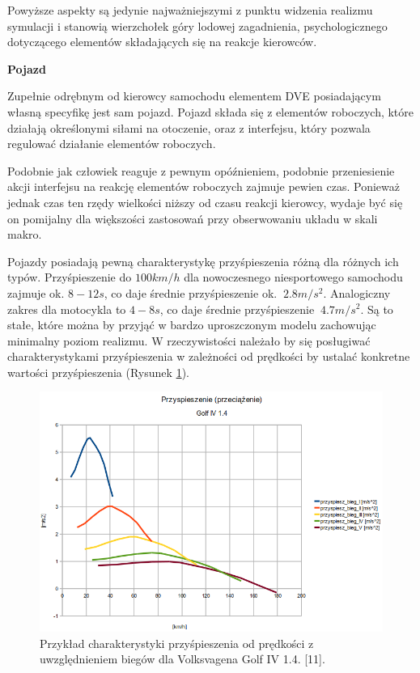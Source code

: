 {{}
\par{
Powyższe aspekty są jedynie najważniejszymi z punktu widzenia realizmu symulacji i stanowią wierzchołek góry lodowej zagadnienia, psychologicznego dotyczącego elementów składających się na reakcje kierowców.
}
\par{ }
\par{
\textbf{Pojazd}
}
\par{
Zupełnie odrębnym od kierowcy samochodu elementem DVE posiadającym własną specyfikę jest sam pojazd. Pojazd składa się z elementów roboczych, które działają określonymi siłami na otoczenie, oraz z interfejsu, który pozwala regulować działanie elementów roboczych.
}
\par{
Podobnie jak człowiek reaguje z pewnym opóźnieniem, podobnie przeniesienie akcji interfejsu na reakcję elementów roboczych zajmuje pewien czas. Ponieważ jednak czas ten rzędy wielkości niższy od czasu reakcji kierowcy, wydaje być się on pomijalny dla większości zastosowań przy obserwowaniu układu w skali makro.
}
\par{
Pojazdy posiadają pewną charakterystykę przyśpieszenia różną dla różnych ich typów. Przyśpieszenie do $100km/h$ dla nowoczesnego niesportowego samochodu zajmuje ok. $8-12s$, co daje średnie przyśpieszenie ok. $~2.8m/s^2$. Analogiczny zakres dla motocykla to $4-8s$, co daje średnie przyśpieszenie $~4.7m/s^2$. Są to stałe, które można by przyjąć w bardzo uproszczonym modelu zachowując minimalny poziom realizmu. W rzeczywistości należało by się posługiwać charakterystykami przyśpieszenia w zależności od prędkości by ustalać konkretne wartości przyśpieszenia (Rysunek \ref{golf}).
}
\begin{figure}[htb]
    \begin{center}
    	\includegraphics[width=\textwidth,keepaspectratio]{img/golf_acc}
	\caption{Przykład charakterystyki przyśpieszenia od prędkości z uwzględnieniem biegów dla Volksvagena Golf IV 1.4. [11].}
	\label{golf}
    \end{center}
\end{figure}

}
